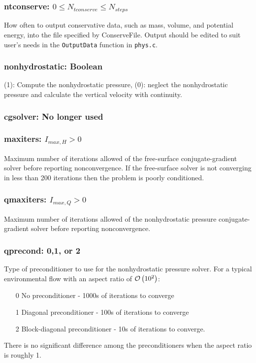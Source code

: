 \documentclass[12pt,oneside]{article}
\begin{document}
\subsubsection{ntconserve: $0\le N_{tconserve}\le N_{steps}$}

How often to output conservative data, such as mass, volume, and potential energy, into
the file specified by ConserveFile.  Output should be edited to suit user's needs in
the \verb+OutputData+ function in \verb+phys.c+.

\subsubsection{nonhydrostatic: Boolean}

(1): Compute the nonhydrostatic pressure, (0): neglect the nonhydrostatic pressure and
calculate the vertical velocity with continuity.

\subsubsection{cgsolver: No longer used}

\subsubsection{maxiters: $I_{max,H}>0$}

Maximum number of iterations allowed of the free-surface conjugate-gradient solver before
reporting nonconvergence.  If the free-surface solver is not converging in less than 200
iterations then the problem is poorly conditioned.

\subsubsection{qmaxiters: $I_{max,Q}>0$}

Maximum number of iterations allowed of the nonhydrostatic pressure conjugate-gradient solver before
reporting nonconvergence. 

\subsubsection{qprecond: 0,1, or 2}

Type of preconditioner to use for the nonhydrostatic pressure solver.  For a typical environmental
flow with an aspect ratio of $\mathcal{O}\left(10^2\right)$:
\begin{enumerate}
\item[0] No preconditioner - 1000s of iterations to converge
\item[1] Diagonal preconditioner - 100s of iterations to converge
\item[2] Block-diagonal preconditioner - 10s of iterations to converge.
\end{enumerate}
There is no significant difference among the preconditioners when the aspect ratio is roughly 1.
\end{document}
